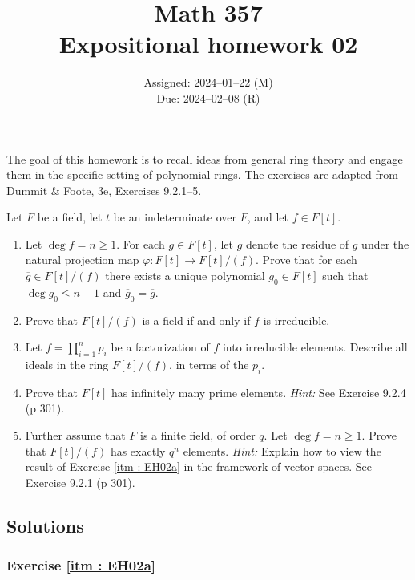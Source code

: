 \documentclass[oneside, english, 11pt]{article}
\title{Math 357\\Expositional homework 02}
\author{}
\date{Assigned: 2024--01--22 (M)\\\hspace{0.33in}Due: 2024--02--08 (R)}
\newcommand{\spaceSolution}[2]{#2}
\newcommand{\spaceSolution}[2]{\vspace{#1}}
\newcommand{\fontHint}[1]{\emph{Hint:} #1}
\begin{document}
\maketitle

The goal of this homework is to recall ideas from general ring theory and engage them in the specific setting of polynomial rings. The exercises are adapted from Dummit \&{} Foote, 3e, Exercises 9.2.1--5.

Let $F$ be a field, let $t$ be an indeterminate over $F$, and let $f \in F[t]$.

\begin{enumerate}[label=(\alph*)]
\item\label{itm : EH02a} Let $\deg f = n \geq 1$. For each $g \in F[t]$, let $\overline{g}$ denote the residue of $g$ under the natural projection map $\varphi : F[t] \rightarrow F[t] / (f)$. Prove that for each $\overline{g} \in F[t] / (f)$ there exists a unique polynomial $g_{0} \in F[t]$ such that $\deg g_{0} \leq n - 1$ and $\overline{g}_{0} = \overline{g}$.
\item\label{itm : EH02b} Prove that $F[t] / (f)$ is a field if and only if $f$ is irreducible.
\item\label{itm : EH02c} Let $f = \prod_{i = 1}^{n} p_{i}$ be a factorization of $f$ into irreducible elements. Describe all ideals in the ring $F[t] / (f)$, in terms of the $p_{i}$.
\item\label{itm : EH02d} Prove that $F[t]$ has infinitely many prime elements. \fontHint{See Exercise 9.2.4 (p 301).}
\item\label{itm : EH02e} Further assume that $F$ is a finite field, of order $q$. Let $\deg f = n \geq 1$. Prove that $F[t] / (f)$ has exactly $q^{n}$ elements. \fontHint{Explain how to view the result of Exercise \ref{itm : EH02a} in the framework of vector spaces. See Exercise 9.2.1 (p 301).}
\end{enumerate}



\subsection*{Solutions}



\subsubsection*{Exercise \ref{itm : EH02a}}
\end{document}
